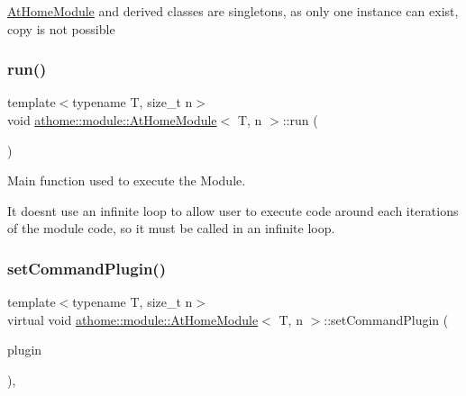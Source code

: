 \mbox{\hyperlink{classathome_1_1module_1_1_at_home_module}{At\+Home\+Module}} and derived classes are singletons, as only one instance can exist, copy is not possible \mbox{\label{classathome_1_1module_1_1_at_home_module_ac39915bf4a255e3610515bc18af3029d}} 
\subsubsection{\texorpdfstring{run()}{run()}}
{\footnotesize\ttfamily template$<$typename T, size\+\_\+t n$>$ \\
void \mbox{\hyperlink{classathome_1_1module_1_1_at_home_module}{athome\+::module\+::\+At\+Home\+Module}}$<$ T, n $>$\+::run (\begin{DoxyParamCaption}{ }\end{DoxyParamCaption})\hspace{0.3cm}{\ttfamily [inline]}}

Main function used to execute the Module.

It doesn\textquotesingle{}t use an infinite loop to allow user to execute code around each iterations of the module code, so it must be called in an infinite loop. \mbox{\label{classathome_1_1module_1_1_at_home_module_a137cdd3cfb9bad5e8e65eddac89ddd41}} 
\subsubsection{\texorpdfstring{set\+Command\+Plugin()}{setCommandPlugin()}}
{\footnotesize\ttfamily template$<$typename T, size\+\_\+t n$>$ \\
virtual void \mbox{\hyperlink{classathome_1_1module_1_1_at_home_module}{athome\+::module\+::\+At\+Home\+Module}}$<$ T, n $>$\+::set\+Command\+Plugin (\begin{DoxyParamCaption}\item[{At\+Home\+Command\+Plugin}]{plugin }\end{DoxyParamCaption})\hspace{0.3cm}{\ttfamily [inline]}, {\ttfamily [virtual]}}

